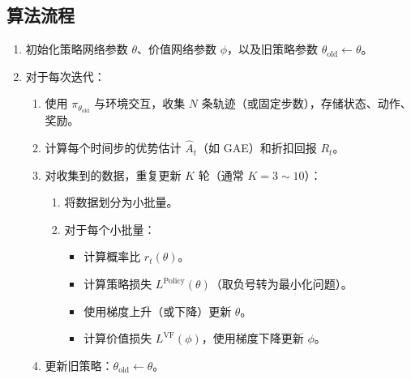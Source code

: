 \documentclass[UTF8]{ctexart}
\begin{document}
\subsection*{算法流程}
\begin{enumerate}
    \item 初始化策略网络参数 $\theta$、价值网络参数 $\phi$，以及旧策略参数 $\theta_{\text{old}} \leftarrow \theta$。
    \item 对于每次迭代：
    \begin{enumerate}
        \item 使用 $\pi_{\theta_{\text{old}}}$ 与环境交互，收集 $N$ 条轨迹（或固定步数），存储状态、动作、奖励。
        \item 计算每个时间步的优势估计 $\hat{A}_t$（如 GAE）和折扣回报 $R_t$。
        \item 对收集到的数据，重复更新 $K$ 轮（通常 $K=3\sim10$）：
        \begin{enumerate}
            \item 将数据划分为小批量。
            \item 对于每个小批量：
            \begin{itemize}
                \item 计算概率比 $r_t(\theta)$。
                \item 计算策略损失 $L^{\text{Policy}}(\theta)$（取负号转为最小化问题）。
                \item 使用梯度上升（或下降）更新 $\theta$。
                \item 计算价值损失 $L^{\text{VF}}(\phi)$，使用梯度下降更新 $\phi$。
            \end{itemize}
        \end{enumerate}
        \item 更新旧策略：$\theta_{\text{old}} \leftarrow \theta$。
    \end{enumerate}
\end{enumerate}
\end{document}
